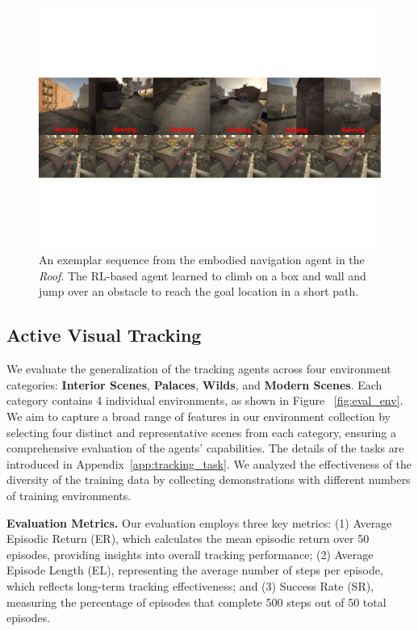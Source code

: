 \documentclass{article}
\begin{document}
\begin{figure}
    \centering
    \includegraphics[width=0.99\linewidth]{image/vis2.pdf}
    \caption{An exemplar sequence from the embodied navigation agent in the \emph{Roof}. The RL-based agent learned to climb on a box and wall and jump over an obstacle to reach the goal location in a short path.}
    \label{fig:eval_example}
    \vspace{-0.5cm}
\end{figure}

\subsection{Active Visual Tracking}

We evaluate the generalization of the tracking agents across four environment categories: \textbf{Interior Scenes}, \textbf{Palaces}, \textbf{Wilds}, and \textbf{Modern Scenes}. 
Each category contains 4 individual environments, as shown in Figure ~\ref{fig:eval_env}.
We aim to capture a broad range of features in our environment collection by selecting four distinct and representative scenes from each category, ensuring a comprehensive evaluation of the agents' capabilities. The details of the tasks are introduced in Appendix~\ref{app:tracking_task}. We analyzed the effectiveness of the diversity of the training data by collecting demonstrations with different numbers of training environments.


\textbf{Evaluation Metrics.}
Our evaluation employs three key metrics: (1) Average Episodic Return (ER), which calculates the mean episodic return over 50 episodes, providing insights into overall tracking performance; (2) Average Episode Length (EL), representing the average number of steps per episode, which reflects long-term tracking effectiveness; and (3) Success Rate (SR), measuring the percentage of episodes that complete 500 steps out of 50 total episodes. 
\end{document}
